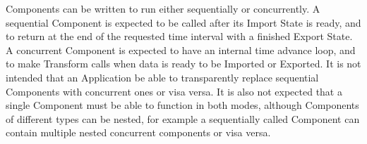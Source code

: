 %


Components can be written to run either sequentially or concurrently.
A sequential Component is expected to be called after
its Import State is ready, and to return at the end of the requested
time interval with a finished Export State.  A concurrent Component
is expected to have an internal time advance loop, and to make 
Transform calls when data is ready to be Imported or Exported.
It is not intended that an Application be able to 
transparently replace sequential Components with concurrent ones
or visa versa.
It is also not expected that a single Component must be able 
to function in both modes, although Components of different
types can be nested, for example a sequentially called 
Component can contain multiple nested concurrent components
or visa versa.

